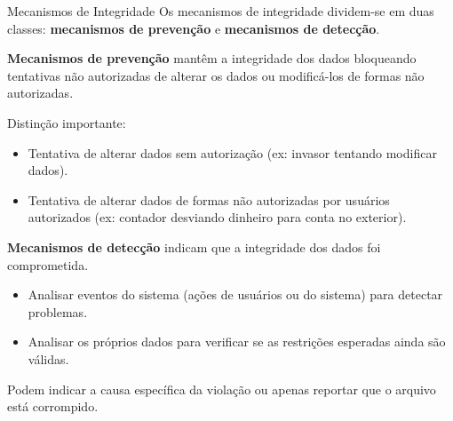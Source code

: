\begin{frame}{Mecanismos de Integridade}
  Os mecanismos de integridade dividem-se em duas classes: \textbf{mecanismos de prevenção} e \textbf{mecanismos de detecção}.

  \vspace{0.3cm}
  \textbf{Mecanismos de prevenção} mantêm a integridade dos dados bloqueando tentativas não autorizadas de alterar os dados ou modificá-los de formas não autorizadas.

  \vspace{0.3cm}
  Distinção importante:
  \begin{itemize}
    \item Tentativa de alterar dados sem autorização (ex: invasor tentando modificar dados).
    \item Tentativa de alterar dados de formas não autorizadas por usuários autorizados (ex: contador desviando dinheiro para conta no exterior).
  \end{itemize}

  \vspace{0.3cm}
  \textbf{Mecanismos de detecção} indicam que a integridade dos dados foi comprometida.

  \begin{itemize}
    \item Analisar eventos do sistema (ações de usuários ou do sistema) para detectar problemas.
    \item Analisar os próprios dados para verificar se as restrições esperadas ainda são válidas.
  \end{itemize}

  Podem indicar a causa específica da violação ou apenas reportar que o arquivo está corrompido.


\end{frame}

